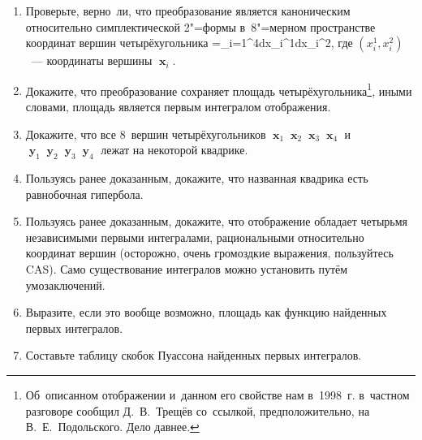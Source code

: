 \documentclass[a4paper,11pt]{article}
\def\[#1\]{\begin{align*}#1\end{align*}}
\theoremstyle{definition}
\begin{document}
\begin{enumerate}
\item
Проверьте, верно~ли, что преобразование является каноническим относительно
симплектической 2"=формы в~8"=мерном пространстве координат вершин
четырёхугольника
	\[
	\omega=\sum_{i=1}^4dx_i^1\wedge dx_i^2,
	\]
где $(x_i^1,x_i^2)$~— координаты вершины $\mbfx_i$.

\item
Докажите, что преобразование сохраняет площадь
четырёхугольника\footnote{Об~описанном отображении и~данном его свойстве нам
в~1998~г. в~частном разговоре сообщил Д.~В.~Трещёв со~ссылкой,
предположительно, на В.~Е.~Подольского. Дело давнее.}, иными словами, площадь
является первым интегралом отображения.

\item
Докажите, что все 8~вершин четырёхугольников $\mbfx_1\mbfx_2\mbfx_3\mbfx_4$
и~$\mbfy_1\mbfy_2\mbfy_3\mbfy_4$ лежат на некоторой квадрике.

\item
Пользуясь ранее доказанным, докажите, что названная квадрика есть равнобочная
гипербола.

\item
Пользуясь ранее доказанным, докажите, что отображение обладает четырьмя
независимыми первыми интегралами, рациональными относительно координат вершин
(осторожно, очень громоздкие выражения, пользуйтесь CAS). Само существование
интегралов можно установить путём умозаключений.

\item
Выразите, если это вообще возможно, площадь как функцию найденных первых
интегралов.

\item
Составьте таблицу скобок Пуассона найденных первых интегралов.

\end{enumerate}
\end{document}
